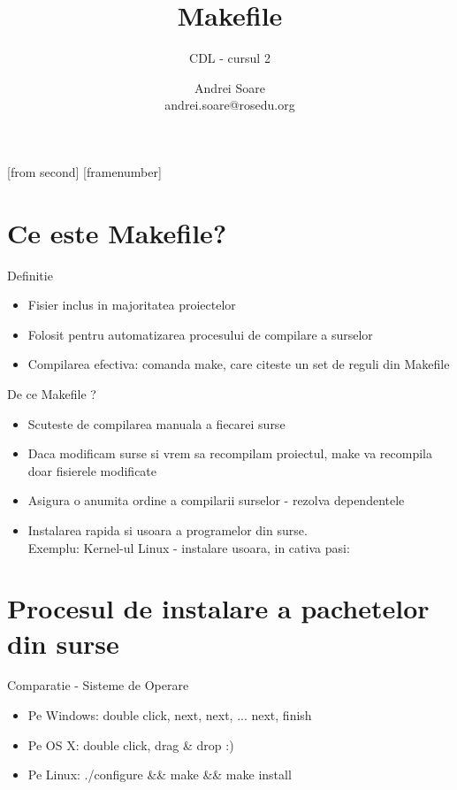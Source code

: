 \documentclass{beamer}
\title[Makefile]{Makefile}
\subtitle{CDL - cursul 2}
\institute{ROSEdu}
\author{Andrei Soare\\{\footnotesize andrei.soare@rosedu.org}}
\begin{document}
[from second]
[framenumber]

\frame{\titlepage}

\frame{\tableofcontents}

\section{Ce este Makefile?}
    \frame{\tableofcontents[currentsection]}
    
    \begin{frame}{Definitie}
    \begin{itemize}
    \setlength{\itemsep}{0.8cm}
    \item Fisier inclus in majoritatea proiectelor
    \item Folosit pentru automatizarea procesului de compilare a surselor
    \item Compilarea efectiva: comanda make, care citeste un set de reguli din Makefile
    \end{itemize}
    \end{frame}

    \begin{frame}{De ce Makefile ?}
    \begin{itemize}
    \setlength{\itemsep}{0.4cm}
    \item Scuteste de compilarea manuala a fiecarei surse
    \item Daca modificam surse si vrem sa recompilam proiectul, make va recompila doar fisierele modificate
    \item Asigura o anumita ordine a compilarii surselor - rezolva dependentele
    \item Instalarea rapida si usoara a programelor din surse.\\Exemplu: Kernel-ul Linux - instalare usoara, in cativa pasi:\\\vspace{0.2cm}
    \end{itemize}
    \end{frame}

\section{Procesul de instalare a pachetelor din surse}
    \frame{\tableofcontents[currentsection]}

    \begin{frame}{Comparatie - Sisteme de Operare}
    \begin{itemize}
    \setlength{\itemsep}{0.5cm}
    \item Pe Windows: double click, next, next, ... next, finish
    \item Pe OS X: double click, drag \& drop :)
    \item Pe Linux: \ttfamily./configure \&\& make \&\& make install\normalfont
    \end{itemize}
    \end{frame}
\end{document}
